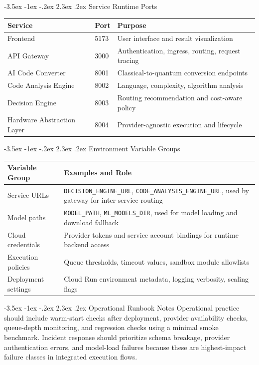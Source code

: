 \documentclass[12pt,a4paper]{report}
\makeatletter
\renewcommand\section{\@startsection{section}{1}{\z@}%
  {-3.5ex \@plus -1ex \@minus -.2ex}%
  {2.3ex \@plus.2ex}%
  {\normalfont\bfseries\fontsize{12pt}{16pt}\selectfont}}
\makeatother
\begin{document}
\section{Service Runtime Ports}
\begin{longtable}{p{}p{}p{}}
\toprule
\textbf{Service} & \textbf{Port} & \textbf{Purpose} \\
\midrule
Frontend & 5173 & User interface and result visualization \\
API Gateway & 3000 & Authentication, ingress, routing, request tracing \\
AI Code Converter & 8001 & Classical-to-quantum conversion endpoints \\
Code Analysis Engine & 8002 & Language, complexity, algorithm analysis \\
Decision Engine & 8003 & Routing recommendation and cost-aware policy \\
Hardware Abstraction Layer & 8004 & Provider-agnostic execution and lifecycle \\
\bottomrule
\end{longtable}

\section{Environment Variable Groups}
\begin{longtable}{p{}p{}}
\toprule
\textbf{Variable Group} & \textbf{Examples and Role} \\
\midrule
Service URLs & \texttt{DECISION\_ENGINE\_URL}, \texttt{CODE\_ANALYSIS\_ENGINE\_URL}, used by gateway for inter-service routing \\
Model paths & \texttt{MODEL\_PATH}, \texttt{ML\_MODELS\_DIR}, used for model loading and download fallback \\
Cloud credentials & Provider tokens and service account bindings for runtime backend access \\
Execution policies & Queue thresholds, timeout values, sandbox module allowlists \\
Deployment settings & Cloud Run environment metadata, logging verbosity, scaling flags \\
\bottomrule
\end{longtable}

\section{Operational Runbook Notes}
Operational practice should include warm-start checks after deployment, provider availability checks, queue-depth monitoring, and regression checks using a minimal smoke benchmark. Incident response should prioritize schema breakage, provider authentication errors, and model-load failures because these are highest-impact failure classes in integrated execution flows.
\end{document}
